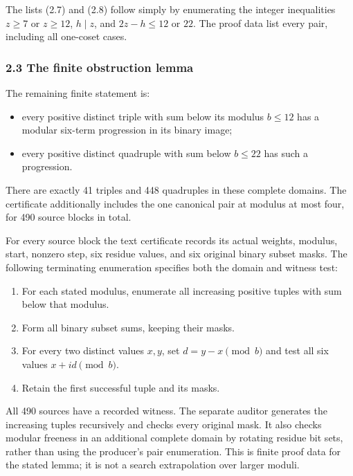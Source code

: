 The lists (2.7) and (2.8) follow simply by enumerating the integer inequalities \(z\ge7\) or \(z\ge12\), \(h\mid z\), and \(2z-h\le12\) or \(22\). The proof data list every pair, including all one-coset cases.

\subsubsection{2.3 The finite obstruction lemma}\label{eporig:the-finite-obstruction-lemma}

The remaining finite statement is:

\begin{itemize}
\tightlist
\item
  every positive distinct triple with sum below its modulus \(b\le12\) has a modular six-term progression in its binary image;
\item
  every positive distinct quadruple with sum below \(b\le22\) has such a progression.
\end{itemize}

There are exactly 41 triples and 448 quadruples in these complete domains. The certificate additionally includes the one canonical pair at modulus at most four, for 490 source blocks in total.

For every source block the text certificate records its actual weights, modulus, start, nonzero step, six residue values, and six original binary subset masks. The following terminating enumeration specifies both the domain and witness test:

\begin{enumerate}
\def\labelenumi{\arabic{enumi}.}
\tightlist
\item
  For each stated modulus, enumerate all increasing positive tuples with sum below that modulus.
\item
  Form all binary subset sums, keeping their masks.
\item
  For every two distinct values \(x,y\), set \(d=y-x\pmod b\) and test all six values \(x+id\pmod b\).
\item
  Retain the first successful tuple and its masks.
\end{enumerate}

All 490 sources have a recorded witness. The separate auditor generates the increasing tuples recursively and checks every original mask. It also checks modular freeness in an additional complete domain by rotating residue bit sets, rather than using the producer's pair enumeration. This is finite proof data for the stated lemma; it is not a search extrapolation over larger moduli.

